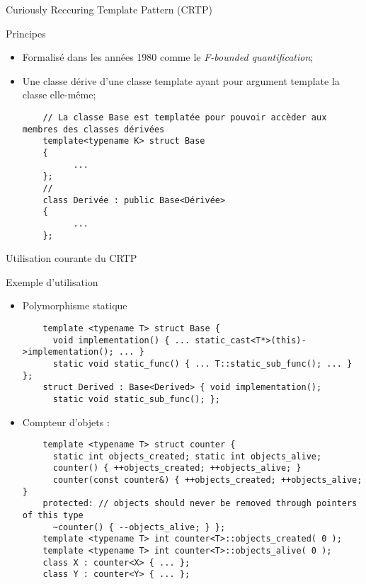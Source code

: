 \documentclass[compress,10pt,aspectratio=169]{beamer}
\begin{document}
  \begin{frame}[fragile]{Curiously Reccuring Template Pattern (CRTP)}
    \scriptsize
    \begin{block}{\small Principes}
    \begin{itemize}
    \item Formalisé dans les années 1980 comme le \textsl{F-bounded quantification};
    \item Une classe \verb@X@ dérive d'une classe template ayant pour argument template la classe \verb@X@ elle-même;
    \begin{verbatim}
    // La classe Base est templatée pour pouvoir accèder aux membres des classes dérivées
    template<typename K> struct Base 
    { 
          ...
    };        
    // 
    class Derivée : public Base<Dérivée> 
    { 
          ... 
    };
    \end{verbatim}
    \end{itemize}
    \end{block}
\end{frame}
    
\begin{frame}[fragile]{Utilisation courante du CRTP}
    \scriptsize
    \begin{exampleblock}{\small Exemple d'utilisation}
    \begin{itemize}
    \item Polymorphisme statique
    \begin{verbatim}
    template <typename T> struct Base { 
      void implementation() { ... static_cast<T*>(this)->implementation(); ... } 
      static void static_func() { ... T::static_sub_func(); ... } }; 
    struct Derived : Base<Derived> { void implementation(); 
      static void static_sub_func(); };
    \end{verbatim}
    \item Compteur d'objets :
    \begin{verbatim}
    template <typename T> struct counter {
      static int objects_created; static int objects_alive;
      counter() { ++objects_created; ++objects_alive; }
      counter(const counter&) { ++objects_created; ++objects_alive; }
    protected: // objects should never be removed through pointers of this type
      ~counter() { --objects_alive; } };
    template <typename T> int counter<T>::objects_created( 0 );
    template <typename T> int counter<T>::objects_alive( 0 );
    class X : counter<X> { ... };
    class Y : counter<Y> { ... };
    \end{verbatim}
    \end{itemize}
    \end{exampleblock}
\end{frame}
\end{document}
